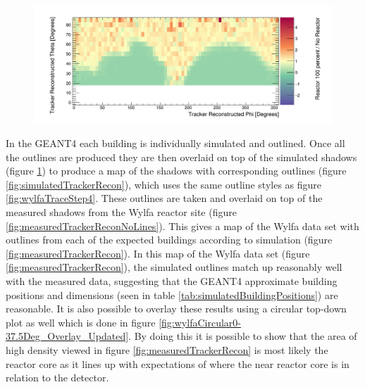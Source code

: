 \begin{figure}[!h]
 \centering
 \includegraphics[width=\linewidth]{Chapter5/Figs/wylfaRasterNew/simulatedTrackerReconNoLines.png}
 \label{fig:simulatedTrackerReconNoLines}
\end{figure}

In the GEANT4 each building is individually simulated and outlined. Once all the outlines are produced they are then overlaid on top of the simulated shadows (figure \ref{fig:simulatedTrackerReconNoLines}) to produce a map of the shadows with corresponding outlines (figure \ref{fig:simulatedTrackerRecon}), which uses the same outline styles as figure \ref{fig:wylfaTraceStep4}. These outlines are taken and overlaid on top of the measured shadows from the Wylfa reactor site (figure \ref{fig:measuredTrackerReconNoLines}). This gives a map of the Wylfa data set with outlines from each of the expected buildings according to simulation (figure \ref{fig:measuredTrackerRecon}). In this map of the Wylfa data set (figure \ref{fig:measuredTrackerRecon}), the simulated outlines match up reasonably well with the measured data, suggesting that the GEANT4 approximate building positions and dimensions (seen in table \ref{tab:simulatedBuildingPositions}) are reasonable. It is also possible to overlay these results using a circular top-down plot as well which is done in figure \ref{fig:wylfaCircular0-37.5Deg_Overlay_Updated}. By doing this it is possible to show that the area of high density viewed in figure \ref{fig:measuredTrackerRecon} is most likely the reactor core as it lines up with expectations of where the near reactor core is in relation to the detector. 

